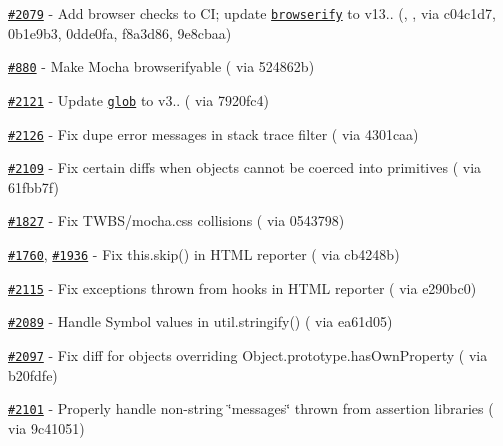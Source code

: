 \begin{DoxyItemize}
\item \href{https://github.com/mochajs/mocha/issues/2079}{\tt \#2079} -\/ Add browser checks to CI; update \href{https://npmjs.com/package/browserify}{\tt browserify} to v13.. (\href{https://github.com/dasilvacontin}{\tt }, \href{https://github.com/ScottFreeCode}{\tt }, \href{https://github.com/boneskull}{\tt } via c04c1d7, 0b1e9b3, 0dde0fa, f8a3d86, 9e8cbaa)
\item \href{https://github.com/mochajs/mocha/issues/880}{\tt \#880} -\/ Make Mocha browserifyable (\href{https://github.com/boneskull}{\tt } via 524862b)
\item \href{https://github.com/mochajs/mocha/issues/2121}{\tt \#2121} -\/ Update \href{https://npmjs.com/package/glob}{\tt glob} to v3.. (\href{https://github.com/astorije}{\tt } via 7920fc4)
\item \href{https://github.com/mochajs/mocha/issues/2126}{\tt \#2126} -\/ Fix dupe error messages in stack trace filter (\href{https://github.com/Turbo87}{\tt } via 4301caa)
\item \href{https://github.com/mochajs/mocha/issues/2109}{\tt \#2109} -\/ Fix certain diffs when objects cannot be coerced into primitives (\href{https://github.com/joshlory}{\tt } via 61fbb7f)
\item \href{https://github.com/mochajs/mocha/pull/1827}{\tt \#1827} -\/ Fix T\+W\+B\+S/{\ttfamily mocha.\+css} collisions (\href{https://github.com/irnc}{\tt } via 0543798)
\item \href{https://github.com/mochajs/mocha/issues/1760}{\tt \#1760}, \href{https://github.com/mochajs/mocha/issues/1936}{\tt \#1936} -\/ Fix {\ttfamily this.\+skip()} in H\+T\+ML reporter (\href{https://github.com/mislav}{\tt } via cb4248b)
\item \href{https://github.com/mochajs/mocha/pull/2115}{\tt \#2115} -\/ Fix exceptions thrown from hooks in H\+T\+ML reporter (\href{https://github.com/danielstjules}{\tt } via e290bc0)
\item \href{https://github.com/mochajs/mocha/issues/2089}{\tt \#2089} -\/ Handle Symbol values in {\ttfamily util.\+stringify()} (\href{https://github.com/ryym}{\tt } via ea61d05)
\item \href{https://github.com/mochajs/mocha/pull/2097}{\tt \#2097} -\/ Fix diff for objects overriding {\ttfamily Object.\+prototype.\+has\+Own\+Property} (\href{https://github.com/mantoni}{\tt } via b20fdfe)
\item \href{https://github.com/mochajs/mocha/pull/2101}{\tt \#2101} -\/ Properly handle non-\/string \char`\"{}messages\char`\"{} thrown from assertion libraries (\href{https://github.com/jkimbo}{\tt } via 9c41051)

\end{DoxyItemize}
